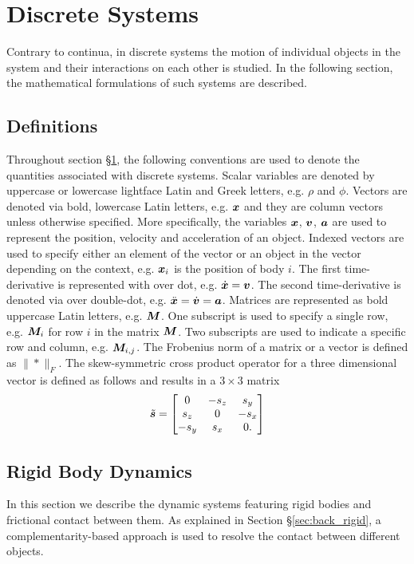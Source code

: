

\chapter{Discrete Systems}\label{chap:discrete_Model}
Contrary to continua, in discrete systems the motion of individual objects in the system and their interactions on each other is studied. In the following section, the mathematical formulations of such systems are described.
\section*{Definitions}
Throughout section \S\ref{chap:discrete_Model}, the following conventions are used to denote the quantities associated with discrete systems. Scalar variables are denoted by uppercase or lowercase lightface Latin and Greek letters, e.g. $\rho$ and $\phi$. Vectors are denoted via bold, lowercase Latin letters, e.g. $\boldsymbol{x}$ and they are column vectors unless otherwise specified. More specifically, the variables $\boldsymbol{x}$, $\boldsymbol{v}$, $\boldsymbol{a}$ are used to represent the position, velocity and acceleration of an object. Indexed vectors are used to specify either an element of the vector or an object in the vector depending on the context, e.g. $\boldsymbol{x}_i$ is the position of body $i$. The first time-derivative is represented with over dot, e.g. $\dot{\boldsymbol{x}} = \boldsymbol{v}$.  The second time-derivative is denoted via over double-dot, e.g. $\ddot{\boldsymbol{x}} = \dot{\boldsymbol{v}} = \boldsymbol{a}$.  Matrices are represented as bold uppercase Latin letters, e.g. $\boldsymbol{M}$. One subscript is used to specify a single row, e.g. $\boldsymbol{M}_i$ for row $i$ in the matrix $\boldsymbol{M}$. Two subscripts are used to indicate a specific row and column, e.g. $\boldsymbol{M}_{i,j}$.   
The Frobenius norm of a matrix or a vector is defined as $\|*\|_F$. The skew-symmetric cross product operator for a three dimensional vector is defined as follows and results in a $3\times 3$ matrix
\begin{equation}
\tilde{{\boldsymbol{s}}} = \begin{bmatrix}
0 & -{s}_z & {s}_y\\ 
{s}_z & 0 & -{s}_x\\ 
-{s}_y & {s}_x & 0.
\end{bmatrix}
\end{equation}
\section{Rigid Body Dynamics}\label{sec:RigidBody}
In this section we describe the dynamic systems featuring rigid bodies and frictional contact between them. As explained in Section \S\ref{sec:back_rigid}, a complementarity-based approach is used to resolve the contact between different objects. 

